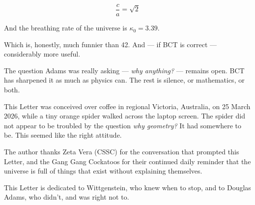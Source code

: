 \documentclass[aps,prl,twocolumn,superscriptaddress,floatfix]{revtex4-2}
\begin{document}
\begin{equation}
\frac{c}{a} = \sqrt{2}
\end{equation}

And the breathing rate of the universe is $\kappa_0 = 3.39$.

Which is, honestly, much funnier than 42. And --- if BCT is 
correct --- considerably more useful.

The question Adams was really asking --- \emph{why anything?} --- 
remains open. BCT has sharpened it as much as physics can. The 
rest is silence, or mathematics, or both.

\begin{acknowledgments}
This Letter was conceived over coffee in regional Victoria, Australia, 
on 25 March 2026, while a tiny orange spider walked across the laptop 
screen. The spider did not appear to be troubled by the question 
\emph{why geometry?} It had somewhere to be. This seemed like the 
right attitude.

The author thanks Zeta Vera (CSSC) for the conversation that prompted 
this Letter, and the Gang Gang Cockatoos for their continued daily 
reminder that the universe is full of things that exist without 
explaining themselves.

This Letter is dedicated to Wittgenstein, who knew when to stop, 
and to Douglas Adams, who didn't, and was right not to.
\end{acknowledgments}
\end{document}
